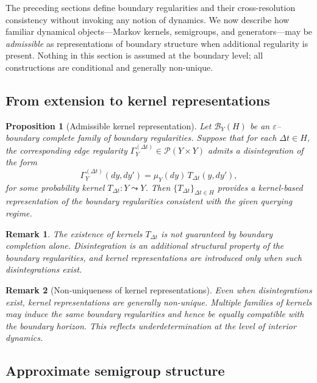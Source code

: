 \documentclass[11pt]{article}
\newtheorem{proposition}{Proposition}
\newtheorem{remark}{Remark}
\begin{document}
The preceding sections define boundary regularities and their cross-resolution consistency
without invoking any notion of dynamics. We now describe how familiar dynamical objects—Markov
kernels, semigroups, and generators—may be \emph{admissible} as representations of boundary structure
when additional regularity is present. Nothing in this section is assumed at the boundary level;
all constructions are conditional and generally non-unique.

\subsection{From extension to kernel representations}

\begin{proposition}[Admissible kernel representation]\label{prop:admissible-kernel}
Let $\mathcal B_Y(H)$ be an $\varepsilon$--boundary complete family of boundary regularities.
Suppose that for each $\Delta t \in H$, the corresponding edge regularity
$\Gamma_Y^{(\Delta t)} \in \mathcal P(Y\times Y)$ admits a disintegration of the form
\[
\Gamma_Y^{(\Delta t)}(dy,dy')
=
\mu_Y(dy)\,T_{\Delta t}(y,dy'),
\]
for some probability kernel $T_{\Delta t}:Y\leadsto Y$.
Then $\{T_{\Delta t}\}_{\Delta t\in H}$ provides a kernel-based representation of the boundary
regularities consistent with the given querying regime.
\end{proposition}

\begin{remark}
The existence of kernels $T_{\Delta t}$ is not guaranteed by boundary completion alone.
Disintegration is an additional structural property of the boundary regularities, and kernel
representations are introduced only when such disintegrations exist.
\end{remark}

\begin{remark}[Non-uniqueness of kernel representations]\label{rem:kernel-nonunique}
Even when disintegrations exist, kernel representations are generally non-unique.
Multiple families of kernels may induce the same boundary regularities and hence be equally
compatible with the boundary horizon. This reflects underdetermination at the level of interior
dynamics.
\end{remark}

\subsection{Approximate semigroup structure}
\end{document}
